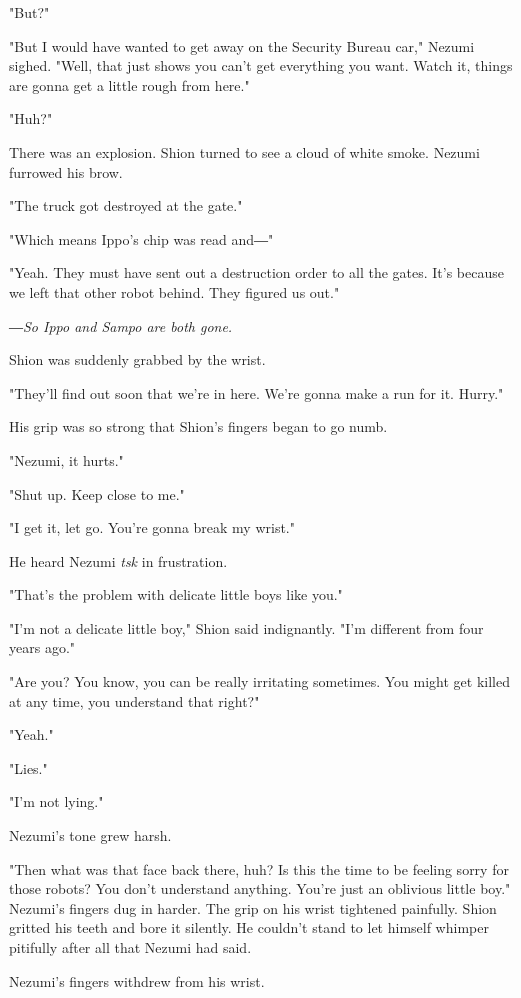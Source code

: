 "But?"

"But I would have wanted to get away on the Security Bureau car," Nezumi
sighed. "Well, that just shows you can't get everything you want. Watch
it, things are gonna get a little rough from here."

"Huh?"

There was an explosion. Shion turned to see a cloud of white smoke.
Nezumi furrowed his brow.

"The truck got destroyed at the gate."

"Which means Ippo's chip was read and―"

"Yeah. They must have sent out a destruction order to all the gates.
It's because we left that other robot behind. They figured us out."

\emph{―So Ippo and Sampo are both gone.}

Shion was suddenly grabbed by the wrist.

"They'll find out soon that we're in here. We're gonna make a run for
it. Hurry."

His grip was so strong that Shion's fingers began to go numb.

"Nezumi, it hurts."

"Shut up. Keep close to me."

"I get it, let go. You're gonna break my wrist."

He heard Nezumi \emph{tsk} in frustration.

"That's the problem with delicate little boys like you."

"I'm not a delicate little boy," Shion said indignantly. "I'm different
from four years ago."

"Are you? You know, you can be really irritating sometimes. You might
get killed at any time, you understand that right?"

"Yeah."

"Lies."

"I'm not lying."

Nezumi's tone grew harsh.

"Then what was that face back there, huh? Is this the time to be feeling
sorry for those robots? You don't understand anything. You're just an
oblivious little boy." Nezumi's fingers dug in harder. The grip on his
wrist tightened painfully. Shion gritted his teeth and bore it silently.
He couldn't stand to let himself whimper pitifully after all that Nezumi
had said.

Nezumi's fingers withdrew from his wrist.

